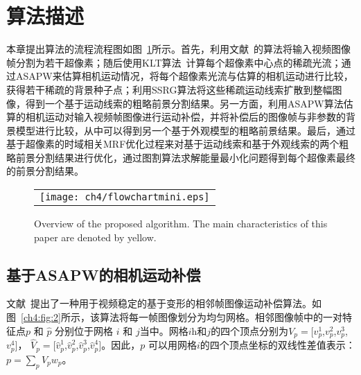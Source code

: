  \section{算法描述}
 \label{ch4:sec:algorithm}
 本章提出算法的流程流程图如图~\ref{ch4:fig:1}所示。首先，利用文献~的算法将输入视频图像帧分割为若干超像素；随后使用KLT算法~\cite{KLT}计算每个超像素中心点的稀疏光流；通过ASAPW来估算相机运动情况，将每个超像素光流与估算的相机运动进行比较，获得若干稀疏的背景种子点；利用SSRG算法将这些稀疏运动线索扩散到整幅图像，得到一个基于运动线索的粗略前景分割结果。另一方面，利用ASAPW算法估算的相机运动对输入视频帧图像进行运动补偿，并将补偿后的图像帧与非参数的背景模型进行比较，从中可以得到另一个基于外观模型的粗略前景结果。最后，通过基于超像素的时域相关MRF优化过程来对基于运动线索和基于外观线索的两个粗略前景分割结果进行优化，通过图割算法\cite{graphcut04}求解能量最小化问题得到每个超像素最终的前景分割结果。

\begin{figure}[!htbp]
\begin{center}
\begin{tabular}{c}
  \texttt{[image: ch4/flowchartmini.eps]}
  \end{tabular}
\end{center}
\caption{Overview of the proposed algorithm. The main characteristics of this paper are denoted by yellow.}
\label{ch4:fig:1}       %
\end{figure}


\subsection{基于ASAPW的相机运动补偿}
\label{ch4:sec:asap}
文献~提出了一种用于视频稳定的基于变形的相邻帧图像运动补偿算法。如图~\ref{ch4:fig:2}所示，该算法将每一帧图像划分为均匀网格。相邻图像帧中的一对特征点\(p\) 和 $\hat{p}$ 分别位于网格 \(i\) 和 \(j\)当中。网格$i$h和$j$的四个顶点分别为${V}_{p}=[{v}^{1}_{p}$,${v}^{2}_{p}$,${v}^{3}_{p}$,${v}^{4}_{p}]$， ${\hat{V}_{p}}=[\hat{v}^{1}_{p}$,$\hat{v}^{2}_{p}$,$\hat{v}^{3}_{p}$,$\hat{v}^{4}_{p}]$。因此，\(p\) 可以用网格\(i\)的四个顶点坐标的双线性差值表示：$p=\sum_{p}{{V}_{p}{w}_{p}}$。


